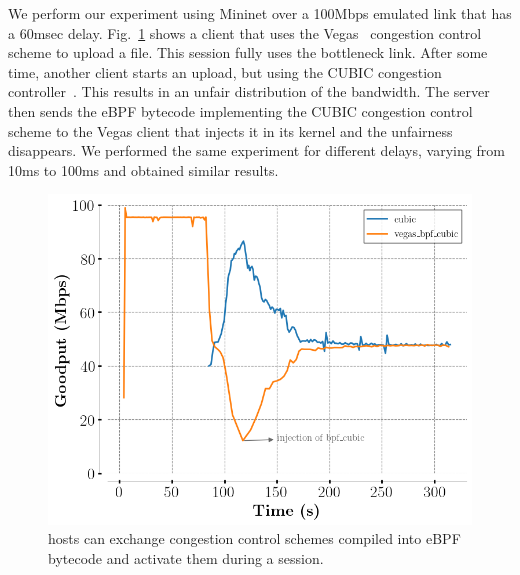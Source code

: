 We perform our experiment using Mininet over a 100Mbps emulated link that has a
60msec delay. Fig.~\ref{fig:vegasCubic} shows a client that uses the \tcp
Vegas~\cite{10.1145/190314.190317} congestion control scheme to upload a file.
This \tcpls session fully uses the bottleneck link. After some time, another
client starts an upload, but using the CUBIC congestion
controller~\cite{rfc8312}. This results in an unfair distribution of the
bandwidth. The server then sends the eBPF bytecode implementing the CUBIC
congestion control scheme to the \tcp Vegas client that injects it in its kernel
and the unfairness disappears. We performed the same experiment for different
delays, varying from 10ms to 100ms and obtained similar results.

\begin{figure}[!t]
  \begin{center}
    \includegraphics[width=.8\columnwidth]{pretty_plotify/plots/vegas_cubic.png}
  \end{center}
\vspace{-0.5cm}
  \caption{\tcpls hosts can exchange congestion control schemes compiled into eBPF bytecode and activate them during a \tcpls session.}
  \label{fig:vegasCubic}
\end{figure}
